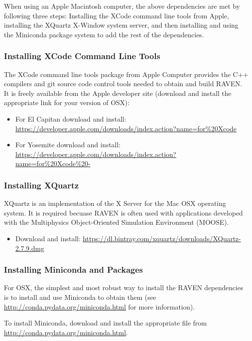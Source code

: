When using an Apple Macintosh computer, the above dependencies are met
by following three steps: Installing the XCode command line tools from Apple, 
installing the XQuartz  X-Window system server, and then installing and using the Miniconda
package system to add the rest of the dependencies.

\subsubsection{Installing XCode Command Line Tools}

The XCode command line tools package from Apple Computer provides the C++ 
compilers and git source code control tools needed to obtain and build RAVEN.
It is freely available from the Apple developer site (download and install the appropriate link 
for your version of OSX):
\begin{itemize}
    \item For El Capitan download and install: \url{https://developer.apple.com/downloads/index.action?name=for%20Xcode}
    \item For Yosemite download and install:  \url{https://developer.apple.com/downloads/index.action?name=for%20Xcode%20-}
\end{itemize}

\subsubsection{Installing XQuartz}
XQuartz is an implementation of the X Server for the Mac OSX operating system.  It is required 
becuase RAVEN is often used with applications developed with the Multiphysics 
Object-Oriented Simulation Environment (MOOSE).
\begin{itemize}
    \item Download and install: \url{https://dl.bintray.com/xquartz/downloads/XQuartz-2.7.9.dmg}
\end{itemize}

\subsubsection{Installing Miniconda and Packages}
\label{miniconda}

For OSX, the simplest and most robust way to install the RAVEN dependencies
is to install and use Miniconda to obtain them (see \url{http://conda.pydata.org/miniconda.html} for more information).

To install Miniconda, download and install the appropriate file from \url{http://conda.pydata.org/miniconda.html}.

